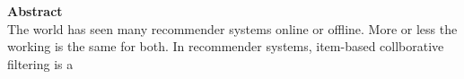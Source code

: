 \begin{center}
\normalsize\textbf{Abstract}\\
\justify
The world has seen many recommender systems online or offline. More or less the working is the same for both. In recommender systems, item-based collborative filtering is a
\end{center}

